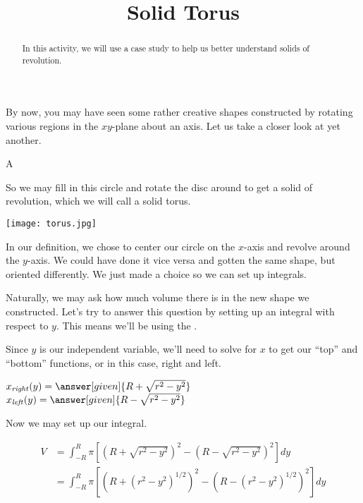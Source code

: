 \documentclass{ximera}
\title{Solid Torus}
\begin{document}
\begin{abstract}
In this activity, we will use a case study to help us better understand solids of revolution.
\end{abstract}
\maketitle

By now, you may have seen some rather creative shapes constructed by rotating various regions in the $xy$-plane about an axis. Let us take a closer look at yet another.
\begin{definition}
	A %
\end{definition}
So we may fill in this circle and rotate the disc around to get a solid of revolution, which we will call a solid torus.
\begin{image}
	\label{torus}
	\texttt{[image: torus.jpg]}
\end{image}

\begin{remark}
	In our definition, we chose to center our circle on the $x$-axis and revolve around the $y$-axis. We could have done it vice versa and gotten the same shape, but oriented differently. We just made a choice so we can set up integrals.
\end{remark} 

\begin{exercise}
	Naturally, we may ask how much volume there is in the new shape we constructed. Let's try to answer this question by setting up an integral with respect to $y$. This means we'll be using the  .
	
	Since $y$ is our independent variable, we'll need to solve for $x$ to get our ``top'' and ``bottom'' functions, or in this case, right and left.
	
	$x_{\mathit{right}}(y) = \answer[given]{R+\sqrt{r^2-y^2}}$
	$x_{\mathit{left}}(y) = \answer[given]{R-\sqrt{r^2-y^2}}$
	
	Now we may set up our integral.
	
	\begin{align*}
		V  &= \int_{-R}^{R} \pi [ (R+\sqrt{r^2-y^2})^{2}-(R-\sqrt{r^2-y^2})^{2}] dy \\
		&= \int_{-R}^{R} \pi [ (R+(r^2-y^2)^{1/2})^{2}-(R-(r^2-y^2)^{1/2})^{2}] dy
	\end{align*}


\end{exercise}
\end{document}
